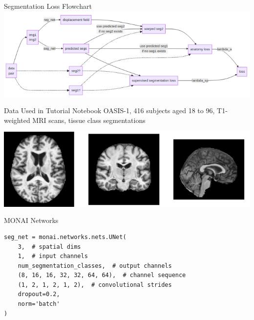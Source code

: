 \documentclass[10pt,aspectratio=169,dvipsnames]{beamer}
\begin{document}
\begin{frame}{Segmentation Loss Flowchart}
\includegraphics[scale=0.75]{figures/seg_loss_flowchart.png}
\end{frame}

\begin{frame}{Data Used in Tutorial Notebook}
OASIS-1, 416 subjects aged 18 to 96, T1-weighted MRI scans, tissue class segmentations

\begin{center}
\includegraphics[scale=0.5]{oasis.png}
\end{center}

\vfill

\end{frame}


\begin{frame}[fragile]{MONAI Networks}
\begin{verbatim}
seg_net = monai.networks.nets.UNet(
	3,  # spatial dims
	1,  # input channels
	num_segmentation_classes,  # output channels
	(8, 16, 16, 32, 32, 64, 64),  # channel sequence
	(1, 2, 1, 2, 1, 2),  # convolutional strides
	dropout=0.2,
	norm='batch'
)
\end{verbatim}
\end{frame}
\end{document}
